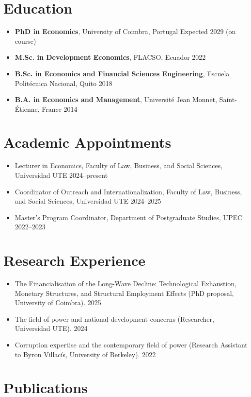 ﻿\documentclass[11pt]{article}
\begin{document}
\section*{Education}
\begin{itemize}
\item \textbf{PhD in Economics}, University of Coimbra, Portugal \hfill Expected 2029 (on course)
\item \textbf{M.Sc. in Development Economics}, FLACSO, Ecuador \hfill 2022
\item \textbf{B.Sc. in Economics and Financial Sciences Engineering}, Escuela Polit\'ecnica Nacional, Quito \hfill 2018
\item \textbf{B.A. in Economics and Management}, Universit\'e Jean Monnet, Saint-\'Etienne, France \hfill 2014
\end{itemize}

\section*{Academic Appointments}
\begin{itemize}
\item Lecturer in Economics, Faculty of Law, Business, and Social Sciences, Universidad UTE \hfill 2024--present
\item Coordinator of Outreach and Internationalization, Faculty of Law, Business, and Social Sciences, Universidad UTE \hfill 2024--2025
\item Master's Program Coordinator, Department of Postgraduate Studies, UPEC \hfill 2022--2023
\end{itemize}

\section*{Research Experience}
\begin{itemize}
\item The Financialisation of the Long-Wave Decline: Technological Exhaustion, Monetary Structures, and Structural Employment Effects (PhD proposal, University of Coimbra). \hfill 2025
\item The field of power and national development concerns (Researcher, Universidad UTE). \hfill 2024
\item Corruption expertise and the contemporary field of power (Research Assistant to Byron Villac\'is, University of Berkeley). \hfill 2022
\end{itemize}

\section*{Publications}
\end{document}
